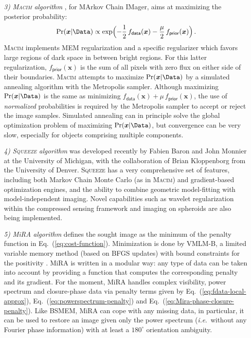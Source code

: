 \documentclass{article}
\newcommand{\Tag}[1]{\mathsf{#1}}        %
\newcommand{\V}[1]{\boldsymbol{#1}}      %
\newcommand{\ie}{\textit{i.e.}\xspace}
\newcommand{\Eq}[1]{Eq.~(\ref{#1})}
\newcommand{\Param}{x}
\newcommand{\VParam}{\V{\Param}}
\newcommand{\DataTag}{\Tag{data}}
\newcommand{\PriorTag}{\Tag{prior}}
\newcommand{\Fcost}{f}
\newcommand{\Fdata}{\Fcost_\DataTag}
\newcommand{\Fprior}{\Fcost_\PriorTag}
\newcommand{\Mira}{MiRA\xspace}
\newcommand{\BSMEM}{BSMEM\xspace}
\newcommand{\Macim}{\textsc{Macim}\xspace}
\newcommand{\Squeeze}{\textsc{Squeeze}\xspace}
\begin{document}
\textit{3) \Macim algorithm} \citep{Ireland_et_al-2006-MACIM}, for MArkov Chain
IMager, aims at maximizing the posterior probability:
\begin{displaymath}
  \Pr(\VParam\vert\Data)\propto
  \exp\Bigl(-\frac{1}{2}\,\Fdata(\VParam)
  - \frac{\mu}{2}\,\Fprior(\VParam)\Bigr) \,.
\end{displaymath}
\Macim implements MEM regularization and a specific regularizer which favors
large regions of dark space in between bright regions.  For this latter
regularization, $\Fprior(\VParam)$ is the sum of all pixels with zero flux on
either side of their boundaries.  \Macim attempts to maximize
$\Pr(\VParam\vert\Data)$ by a simulated annealing algorithm with the
Metropolis sampler.  Although maximizing $\Pr(\VParam\vert\Data)$ is the same
as minimizing $\Fdata(\VParam)+\mu\,\Fprior(\VParam)$, the use of
\emph{normalized} probabilities is required by the Metropolis sampler to
accept or reject the image samples. Simulated annealing can in principle solve
the global optimization problem of maximizing $\Pr(\VParam\vert\Data)$, but
convergence can be very slow, especially for objects comprising multiple
components.

\textit{4) \Squeeze algorithm} \citep{Baron_et_al-2010-SQUEEZE} was developed
recently by Fabien Baron and John Monnier at the University of Michigan, with
the collaboration of Brian Kloppenborg from the University of Denver. \Squeeze
has a very comprehensive set of features, including both Markov Chain Monte
Carlo (as in \Macim) and gradient-based optimization engines, and the ability
to combine geometric model-fitting with model-independent imaging. Novel
capabilities such as wavelet regularization within the compressed sensing
framework and imaging on spheroids are also being implemented.

\textit{5) \Mira algorithm} \citep{Thiebaut-2008-Marseille} defines the sought
image as the minimum of the penalty function in \Eq{eq:cost-function}.
Minimization is done by VMLM-B, a limited variable memory method (based on
BFGS updates) with bound constraints for the positivity
\citep{Thiebaut:spie2002:bdec}.  \Mira is written in a modular way: any type
of data can be taken into account by providing a function that computes the
corresponding penalty and its gradient.  For the moment, \Mira handles complex
visibility, power spectrum and closure-phase data via penalty terms given by
\Eq{eq:fdata-local-approx}, \Eq{eq:powerspectrum-penalty} and
\Eq{eq:Mira-phase-closure-penalty}. Like \BSMEM, \Mira can cope with any
missing data, in particular, it can be used to restore an image given only the
power spectrum (\ie\ without any Fourier phase information) with at least a
$180^\circ$ orientation ambiguity.
\end{document}
